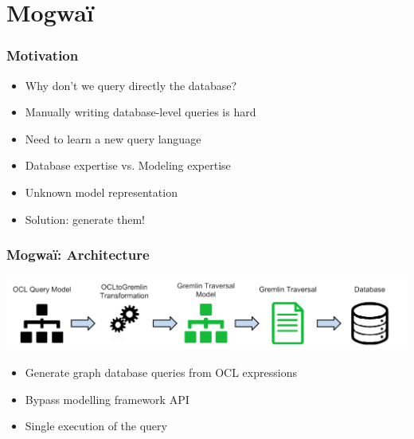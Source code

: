 \documentclass[10pt]{beamer}
\begin{document}
\section{Mogwa\"i}

\begin{frame}[c]\frametitle{Motivation}
	\begin{itemize}
	\item Why don't we query directly the database?
	\item Manually writing database-level queries is hard
	\item Need to learn a new query language
	\item Database expertise vs. Modeling expertise
	\item Unknown model representation
	\item Solution: generate them!
	\end{itemize}
	
\end{frame}

\begin{frame}[t]\frametitle{Mogwa\"i: Architecture~\cite{DBLP:conf/rcis/DanielSC16}}
  \begin{center}
    \includegraphics[width=\textwidth]{mogwai-architecture.png}
  \end{center}
	\begin{itemize}
	\item Generate graph database queries from OCL expressions
	\item Bypass modelling framework API
	\item Single execution of the query
	\end{itemize}
	
\end{frame}
\end{document}
